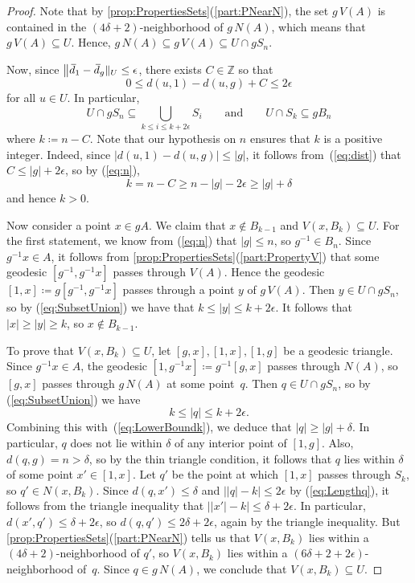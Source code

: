 \documentclass[11pt,letterpaper]{amsart}
\theoremstyle{definition}
\newcommand{\Z}{\mathbb{Z}}
\newcommand{\od}{\mkern 3mu\overline{\mkern-3mu d\mkern 1.5mu}\mkern-1.5mu}
\begin{document}
\begin{proof}
Note that by \cref{prop:PropertiesSets}(\ref{part:PNearN}), the set $g\,V(A)$ is contained in the $(4\delta+2)$-neighborhood of $g\,N(A)$, which means that $g\,V(A)\subseteq U$.  Hence, $g\,N(A)\subseteq g\,V(A)\subseteq U\cap gS_n$.

Now, since $\bigl\|\od_{1}-\od_{g}\|_U\leq \epsilon$, there exists $C\in\Z$ so that
\begin{equation}\label{eq:dist}
0 \leq d(u,1)-d(u,g) + C\leq 2\epsilon
\end{equation}
for all $u\in U$. In particular,
\begin{equation}\label{eq:SubsetUnion}
U\cap g S_n\subseteq \bigcup_{k\leq i\leq k+2\epsilon} S_i\qquad\text{and}\qquad U\cap S_k\subseteq g B_n
\end{equation}
where $k\coloneqq n-C$. Note that our hypothesis on $n$ ensures that $k$ is a positive integer.  Indeed, since $|d(u,1)-d(u,g)|\leq |g|$, it follows from~(\ref{eq:dist}) that $C\leq |g|+2\epsilon$,
so by (\ref{eq:n}), 
\begin{equation}\label{eq:LowerBoundk}
k = n-C \ge n-|g|-2\epsilon\ge |g|+\delta
\end{equation}
and hence $k>0$.

Now consider a point $x\in gA$.  We claim that $x\notin B_{k-1}$ and $V(x,B_k)\subseteq U$.  For the first statement, we know from (\ref{eq:n}) that $|g|\leq n$, so  $g^{-1}\in B_n$. Since $g^{-1}x\in A$, it follows from \cref{prop:PropertiesSets}(\ref{part:PropertyV}) that some geodesic $[g^{-1},g^{-1}x]$ passes through $V(A)$.  Hence the geodesic $[1,x]\coloneqq g[g^{-1},g^{-1}x]$ passes through a point $y$ of $g\,V(A)$. Then $y\in U\cap gS_n$, so by (\ref{eq:SubsetUnion}) we have that $k\leq |y|\leq k+2\epsilon$.  It follows that $|x|\geq |y|\geq k$, so $x\notin B_{k-1}$.

To prove that $V(x,B_k)\subseteq U$, let $[g,x],[1,x],[1,g]$ be a geodesic triangle. Since $g^{-1}x\in A$, the geodesic $[1,g^{-1}x]\coloneqq g^{-1}[g,x]$ passes through $N(A)$, so $[g,x]$ passes through $g\,N(A)$ at some point~$q$.  Then $q\in  U\cap gS_n$, so by (\ref{eq:SubsetUnion}) we have
\begin{equation}\label{eq:Lengthq}
 k\leq |q|\leq k+2\epsilon.
\end{equation}
Combining this with~(\ref{eq:LowerBoundk}), we deduce that $|q|\geq |g|+\delta$.  In particular, $q$ does not lie within $\delta$ of any interior point of $[1,g]$. Also, $d(q,g)=n>\delta$, so by the thin triangle condition, it follows that $q$ lies within $\delta$ of some point $x'\in[1,x]$.  Let $q'$ be the point at which $[1,x]$ passes through $S_k$, so $q'\in N(x,B_k)$. Since $d(q,x')\leq \delta$ and $\bigl||q|-k\bigr|\leq 2\epsilon$ by (\ref{eq:Lengthq}), it follows from the triangle inequality that $\bigl||x'|-k\bigr|\leq \delta+2\epsilon$.  In particular, $d(x',q')\leq \delta+2\epsilon$, so $d(q,q')\leq 2\delta+2\epsilon$, again by the triangle inequality.  But \cref{prop:PropertiesSets}(\ref{part:PNearN}) tells us that $V(x,B_k)$ lies within a $(4\delta+2)$-neighborhood of $q'$, so $V(x,B_k)$ lies within a $(6\delta+2+2\epsilon)$-neighborhood of~$q$. Since $q\in g\,N(A)$, we conclude that $V(x,B_k)\subseteq U$.
 

\end{proof}
\end{document}
